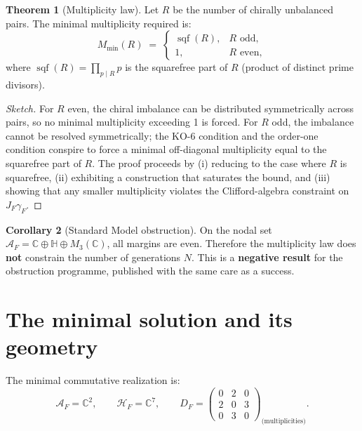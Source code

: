 \documentclass[11pt,a4paper]{article}
\theoremstyle{definition}
\newtheorem{theorem}{Theorem}[section]
\newtheorem{corollary}[theorem]{Corollary}
\begin{document}
\begin{theorem}[Multiplicity law]
Let $R$ be the number of chirally unbalanced pairs. The minimal multiplicity required is:
\[
M_{\min}(R) \;=\;
\begin{cases}
\operatorname{sqf}(R), & R \text{ odd}, \\[4pt]
1, & R \text{ even},
\end{cases}
\]
where $\operatorname{sqf}(R) = \prod_{p \mid R} p$ is the squarefree part of $R$ (product of distinct prime divisors).
\end{theorem}

\begin{proof}[Sketch]
For $R$ even, the chiral imbalance can be distributed symmetrically across pairs, so no minimal multiplicity exceeding 1 is forced. For $R$ odd, the imbalance cannot be resolved symmetrically; the KO-6 condition and the order-one condition conspire to force a minimal off-diagonal multiplicity equal to the squarefree part of $R$. The proof proceeds by (i) reducing to the case where $R$ is squarefree, (ii) exhibiting a construction that saturates the bound, and (iii) showing that any smaller multiplicity violates the Clifford-algebra constraint on $J_F \gamma_F$.
\end{proof}

\begin{corollary}[Standard Model obstruction]
On the nodal set $\mathcal{A}_F = \mathbb{C} \oplus \mathbb{H} \oplus M_3(\mathbb{C})$, all margins are even. Therefore the multiplicity law does \textbf{not} constrain the number of generations $N$. This is a \textbf{negative result} for the obstruction programme, published with the same care as a success.
\end{corollary}

\section{The minimal solution and its geometry}

The minimal commutative realization is:
\begin{equation}
\mathcal{A}_F = \mathbb{C}^2, \qquad
\mathcal{H}_F = \mathbb{C}^7, \qquad
D_F = \begin{pmatrix}
0 & 2 & 0 \\
2 & 0 & 3 \\
0 & 3 & 0
\end{pmatrix}_{\text{(multiplicities)}}.
\end{equation}
\end{document}
